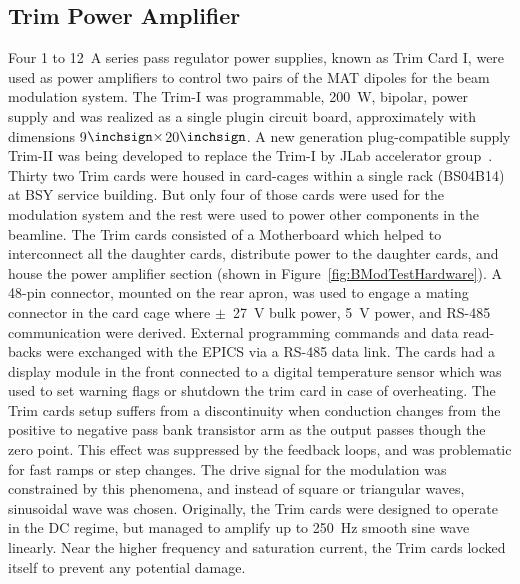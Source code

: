\subsection{Trim Power Amplifier}
\label{Trim Power Amplifier}
Four 1 to 12~A series pass regulator power supplies, known as Trim Card I, were used as power amplifiers to control two pairs of the MAT dipoles for the beam modulation system. The Trim-I was programmable, 200~W, bipolar, power supply and was realized as a single plugin circuit board, approximately with dimensions 9$\inchsign\times$20$\inchsign$. A new generation plug-compatible supply Trim-II was being developed to replace the Trim-I by JLab accelerator group~\cite{1591576}. Thirty two Trim cards were housed in card-cages within a single rack (BS04B14) at BSY service building. But only four of those cards were used for the modulation system and the rest were used to power other components in the beamline. The Trim cards consisted of a Motherboard which helped to interconnect all the daughter cards, distribute power to the daughter cards, and house the power amplifier section (shown in Figure~\ref{fig:BModTestHardware}). A 48-pin connector, mounted on the rear apron, was used to engage a mating connector in the card cage where $\pm$~27~V bulk power, 5~V power, and RS-485 communication were derived. External programming commands and data read-backs were exchanged with the EPICS via a RS-485 data link. The cards had a display module in the front connected to a digital temperature sensor which was used to set warning flags or shutdown the trim card in case of overheating. The Trim cards setup suffers from a discontinuity when conduction changes from the positive to negative pass bank transistor arm as the output passes though the zero point. This effect was suppressed by the feedback loops, and was problematic for fast ramps or step changes. The drive signal for the modulation was constrained by this phenomena, and instead of square or triangular waves, sinusoidal wave was chosen. Originally, the Trim cards were designed to operate in the DC regime, but managed to amplify up to 250~Hz smooth sine wave linearly. Near the higher frequency and saturation current, the Trim cards locked itself to prevent any potential damage. 

